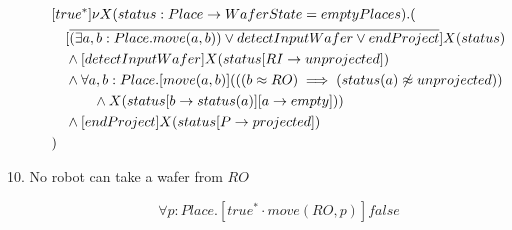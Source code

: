 \begin{description}
\begin{align*}
&[true^*] \nu X(status:Place \to WaferState=emptyPlaces).( \\
&\tab  [\overline{(\exists a,b:Place.move(a,b)) \vee detectInputWafer \vee endProject}]X(status) \\
&\tab  \wedge [detectInputWafer]X(status[RI \to unprojected]) \\
&\tab  \wedge \forall a,b:Place.[move(a, b)](((b \approx RO) \implies (status(a) \not \approx unprojected)) \\
&\tab\tab\tab \wedge X(status[b \to status(a)][a \to empty])) \\
&\tab  \wedge [endProject]X(status[P \to projected]) \\
&)
\end{align*}

 \item[10. No robot can take a wafer from $RO$]

\[
	\forall p:Place . [true^* \cdot move(RO, p)]false
\]

\end{description}
